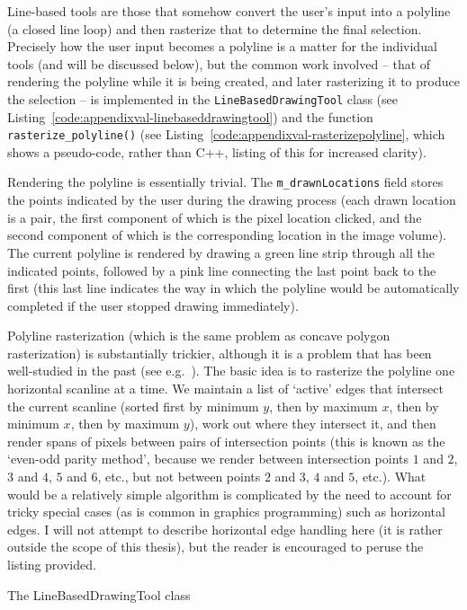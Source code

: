 Line-based tools are those that somehow convert the user's input into a polyline (a closed line loop) and then rasterize that to determine the final selection. Precisely how the user input becomes a polyline is a matter for the individual tools (and will be discussed below), but the common work involved -- that of rendering the polyline while it is being created, and later rasterizing it to produce the selection -- is implemented in the \texttt{LineBasedDrawingTool} class (see Listing~\ref{code:appendixval-linebaseddrawingtool}) and the function \texttt{rasterize_polyline()} (see Listing~\ref{code:appendixval-rasterizepolyline}, which shows a pseudo-code, rather than C++, listing of this for increased clarity).

Rendering the polyline is essentially trivial. The \texttt{m_drawnLocations} field stores the points indicated by the user during the drawing process (each drawn location is a pair, the first component of which is the pixel location clicked, and the second component of which is the corresponding location in the image volume). The current polyline is rendered by drawing a green line strip through all the indicated points, followed by a pink line connecting the last point back to the first (this last line indicates the way in which the polyline would be automatically completed if the user stopped drawing immediately).

Polyline rasterization (which is the same problem as concave polygon rasterization) is substantially trickier, although it is a problem that has been well-studied in the past (see e.g.~\cite{heckbert90}). The basic idea is to rasterize the polyline one horizontal scanline at a time. We maintain a list of `active' edges that intersect the current scanline (sorted first by minimum $y$, then by maximum $x$, then by minimum $x$, then by maximum $y$), work out where they intersect it, and then render spans of pixels between pairs of intersection points (this is known as the `even-odd parity method', because we render between intersection points $1$ and $2$, $3$ and $4$, $5$ and $6$, etc., but not between points $2$ and $3$, $4$ and $5$, etc.). What would be a relatively simple algorithm is complicated by the need to account for tricky special cases (as is common in graphics programming) such as horizontal edges. I will not attempt to describe horizontal edge handling here (it is rather outside the scope of this thesis), but the reader is encouraged to peruse the listing provided.

\begin{stulisting}[p]
\caption{The LineBasedDrawingTool class}
\label{code:appendixval-linebaseddrawingtool}

\end{stulisting}

